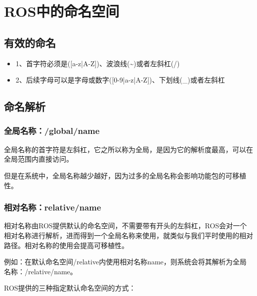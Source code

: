 \documentclass[10pt, oneside]{book}
\begin{document}
\section{ROS中的命名空间}

\subsection{有效的命名}

\begin{itemize}
    \item 1、首字符必须是([a-z|A-Z])、波浪线(\textasciitilde)或者左斜杠(/)
    \item 2、后续字母可以是字母或数字([0-9|a-z|A-Z])、下划线(\_)或者左斜杠
\end{itemize}

\subsection{命名解析}

\subsubsection{全局名称：/global/name}

全局名称的首字符是左斜杠，它之所以称为全局，是因为它的解析度最高，可以在全局范围内直接访问。

但是在系统中，全局名称越少越好，因为过多的全局名称会影响功能包的可移植性。

\subsubsection{相对名称：relative/name}

相对名称由ROS提供默认的命名空间，不需要带有开头的左斜杠，ROS会对一个相对名称进行解析，进而得到一个全局名称来使用，就类似与我们平时使用的相对路径。相对名称的使用会提高可移植性。

例如：在默认命名空间/relative内使用相对名称name，则系统会将其解析为全局名称：/relative/name。

ROS提供的三种指定默认命名空间的方式：
\end{document}
